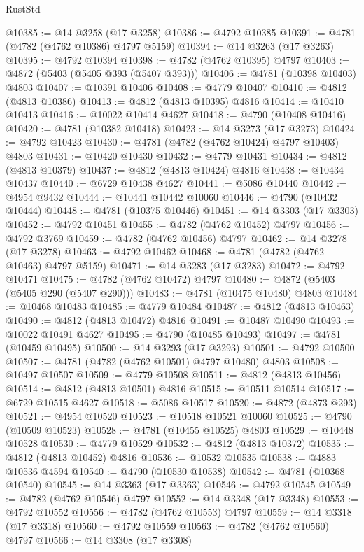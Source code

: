 \begin{lexlean}{RustStd}
\begin{coremodule}
@10385 := @14 @3258 (@17 @3258)
@10386 := @4792 @10385
@10391 := @4781 (@4782 (@4762 @10386) @4797 @5159)
@10394 := @14 @3263 (@17 @3263)
@10395 := @4792 @10394
@10398 := @4782 (@4762 @10395) @4797
@10403 := @4872 (@5403 (@5405 @393 (@5407 @393)))
@10406 := @4781 (@10398 @10403) @4803
@10407 := @10391 @10406
@10408 := @4779 @10407
@10410 := @4812 (@4813 @10386)
@10413 := @4812 (@4813 @10395) @4816
@10414 := @10410 @10413
@10416 := @10022 @10414 @4627
@10418 := @4790 (@10408 @10416)
@10420 := @4781 (@10382 @10418)
@10423 := @14 @3273 (@17 @3273)
@10424 := @4792 @10423
@10430 := @4781 (@4782 (@4762 @10424) @4797 @10403) @4803
@10431 := @10420 @10430
@10432 := @4779 @10431
@10434 := @4812 (@4813 @10379)
@10437 := @4812 (@4813 @10424) @4816
@10438 := @10434 @10437
@10440 := @6729 @10438 @4627
@10441 := @5086 @10440
@10442 := @4954 @9432
@10444 := @10441 @10442 @10060
@10446 := @4790 (@10432 @10444)
@10448 := @4781 (@10375 @10446)
@10451 := @14 @3303 (@17 @3303)
@10452 := @4792 @10451
@10455 := @4782 (@4762 @10452) @4797
@10456 := @4792 @3769
@10459 := @4782 (@4762 @10456) @4797
@10462 := @14 @3278 (@17 @3278)
@10463 := @4792 @10462
@10468 := @4781 (@4782 (@4762 @10463) @4797 @5159)
@10471 := @14 @3283 (@17 @3283)
@10472 := @4792 @10471
@10475 := @4782 (@4762 @10472) @4797
@10480 := @4872 (@5403 (@5405 @290 (@5407 @290)))
@10483 := @4781 (@10475 @10480) @4803
@10484 := @10468 @10483
@10485 := @4779 @10484
@10487 := @4812 (@4813 @10463)
@10490 := @4812 (@4813 @10472) @4816
@10491 := @10487 @10490
@10493 := @10022 @10491 @4627
@10495 := @4790 (@10485 @10493)
@10497 := @4781 (@10459 @10495)
@10500 := @14 @3293 (@17 @3293)
@10501 := @4792 @10500
@10507 := @4781 (@4782 (@4762 @10501) @4797 @10480) @4803
@10508 := @10497 @10507
@10509 := @4779 @10508
@10511 := @4812 (@4813 @10456)
@10514 := @4812 (@4813 @10501) @4816
@10515 := @10511 @10514
@10517 := @6729 @10515 @4627
@10518 := @5086 @10517
@10520 := @4872 (@4873 @293)
@10521 := @4954 @10520
@10523 := @10518 @10521 @10060
@10525 := @4790 (@10509 @10523)
@10528 := @4781 (@10455 @10525) @4803
@10529 := @10448 @10528
@10530 := @4779 @10529
@10532 := @4812 (@4813 @10372)
@10535 := @4812 (@4813 @10452) @4816
@10536 := @10532 @10535
@10538 := @4883 @10536 @4594
@10540 := @4790 (@10530 @10538)
@10542 := @4781 (@10368 @10540)
@10545 := @14 @3363 (@17 @3363)
@10546 := @4792 @10545
@10549 := @4782 (@4762 @10546) @4797
@10552 := @14 @3348 (@17 @3348)
@10553 := @4792 @10552
@10556 := @4782 (@4762 @10553) @4797
@10559 := @14 @3318 (@17 @3318)
@10560 := @4792 @10559
@10563 := @4782 (@4762 @10560) @4797
@10566 := @14 @3308 (@17 @3308)

\end{coremodule}
\end{lexlean}
